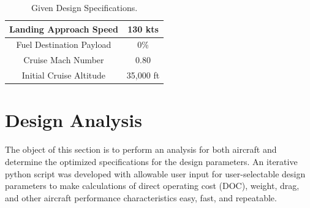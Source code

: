 \documentclass{article}
\begin{document}
\begin{table}[ht]
\begin{tabular}{|c|c|}
            Landing Approach Speed                & 130 kts                          \\ \hline
            \rowcolor[HTML]{C0C0C0}
            Fuel Destination Payload              & 0\%                              \\ \hline
            Cruise Mach Number                    & 0.80                             \\ \hline
            \rowcolor[HTML]{C0C0C0}
            Initial Cruise Altitude               & 35,000 ft                        \\ \hline
        \end{tabular}
        \caption{Given Design Specifications.}
    \end{table}

    \section{Design Analysis}
    \label{sec:design}
    \begin{flushleft}
        The object of this section is to perform an analysis for both aircraft
        and determine the optimized specifications for the design parameters. An
        iterative python script was developed with allowable user input for
        user-selectable design parameters to make calculations of direct
        operating cost (DOC), weight, drag, and other aircraft performance
        characteristics easy, fast, and repeatable.
    \end{flushleft}
\end{document}
